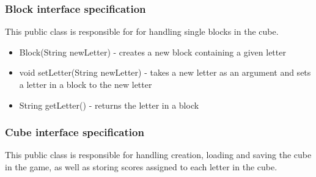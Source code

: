         \subsubsection{Block interface specification} %
        This public class is responsible for for handling single blocks in the cube.
        \begin{itemize}
        \item Block(String newLetter) - creates a new block containing a given letter
\item  void setLetter(String newLetter) - takes a new letter as an argument and sets a letter in a block to the new letter
\item  String getLetter() - returns the letter in a block

		\end{itemize}
        \subsubsection{Cube interface specification} %
        This public class is responsible for handling creation, loading and saving the cube in the game, as well as storing scores assigned to each letter in the cube.
